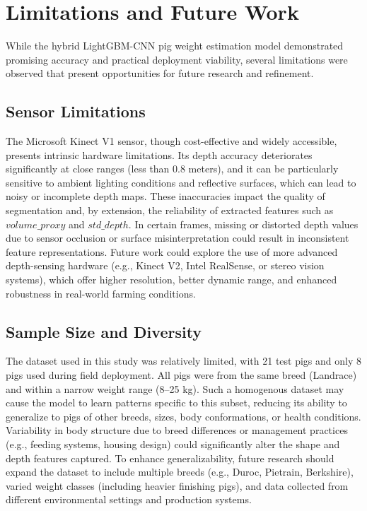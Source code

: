 \section{Limitations and Future Work}

While the hybrid LightGBM-CNN pig weight estimation model demonstrated promising accuracy and practical deployment viability, several limitations were observed that present opportunities for future research and refinement.

\subsection{Sensor Limitations}

The Microsoft Kinect V1 sensor, though cost-effective and widely accessible, presents intrinsic hardware limitations. Its depth accuracy deteriorates significantly at close ranges (less than 0.8 meters), and it can be particularly sensitive to ambient lighting conditions and reflective surfaces, which can lead to noisy or incomplete depth maps. These inaccuracies impact the quality of segmentation and, by extension, the reliability of extracted features such as $volume\_proxy$ and $std\_depth$. In certain frames, missing or distorted depth values due to sensor occlusion or surface misinterpretation could result in inconsistent feature representations. Future work could explore the use of more advanced depth-sensing hardware (e.g., Kinect V2, Intel RealSense, or stereo vision systems), which offer higher resolution, better dynamic range, and enhanced robustness in real-world farming conditions.


\subsection{Sample Size and Diversity}

The dataset used in this study was relatively limited, with 21 test pigs and only 8 pigs used during field deployment. All pigs were from the same breed (Landrace) and within a narrow weight range (8–25 kg). Such a homogenous dataset may cause the model to learn patterns specific to this subset, reducing its ability to generalize to pigs of other breeds, sizes, body conformations, or health conditions. Variability in body structure due to breed differences or management practices (e.g., feeding systems, housing design) could significantly alter the shape and depth features captured. To enhance generalizability, future research should expand the dataset to include multiple breeds (e.g., Duroc, Pietrain, Berkshire), varied weight classes (including heavier finishing pigs), and data collected from different environmental settings and production systems.

